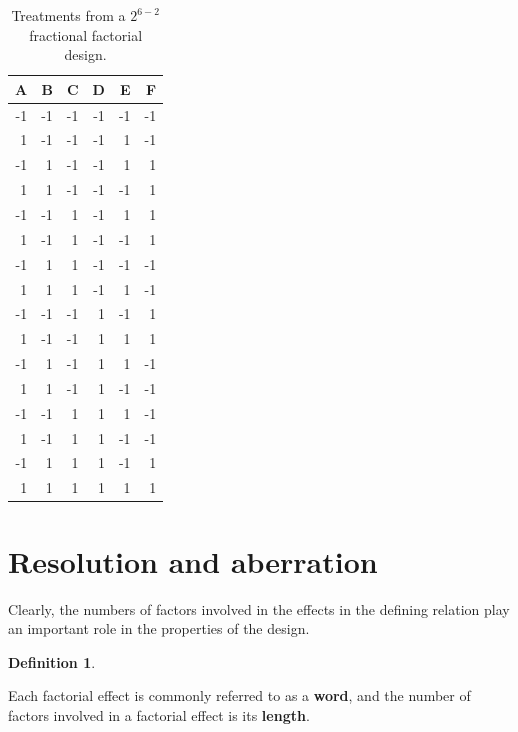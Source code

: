 \documentclass[
]{book}
\theoremstyle{definition}
\newtheorem{definition}{Definition}[chapter]
\theoremstyle{definition}
\theoremstyle{definition}
\theoremstyle{definition}
\theoremstyle{remark}
\begin{document}
\begin{table}

\caption{\label{tab:FrF2-example-design}Treatments from a $2^{6-2}$ fractional factorial design.}
\centering
\begin{tabular}[t]{r|r|r|r|r|r}
\hline
A & B & C & D & E & F\\
\hline
-1 & -1 & -1 & -1 & -1 & -1\\
\hline
1 & -1 & -1 & -1 & 1 & -1\\
\hline
-1 & 1 & -1 & -1 & 1 & 1\\
\hline
1 & 1 & -1 & -1 & -1 & 1\\
\hline
-1 & -1 & 1 & -1 & 1 & 1\\
\hline
1 & -1 & 1 & -1 & -1 & 1\\
\hline
-1 & 1 & 1 & -1 & -1 & -1\\
\hline
1 & 1 & 1 & -1 & 1 & -1\\
\hline
-1 & -1 & -1 & 1 & -1 & 1\\
\hline
1 & -1 & -1 & 1 & 1 & 1\\
\hline
-1 & 1 & -1 & 1 & 1 & -1\\
\hline
1 & 1 & -1 & 1 & -1 & -1\\
\hline
-1 & -1 & 1 & 1 & 1 & -1\\
\hline
1 & -1 & 1 & 1 & -1 & -1\\
\hline
-1 & 1 & 1 & 1 & -1 & 1\\
\hline
1 & 1 & 1 & 1 & 1 & 1\\
\hline
\end{tabular}
\end{table}

\hypertarget{resolution-and-aberration}{%
\section{Resolution and aberration}\label{resolution-and-aberration}}

Clearly, the numbers of factors involved in the effects in the defining relation play an important role in the properties of the design.

\begin{definition}
\protect\hypertarget{def:length}{}\label{def:length}

Each factorial effect is commonly referred to as a \textbf{word}, and the number of factors involved in a factorial effect is its \textbf{length}.

\end{definition}
\end{document}
